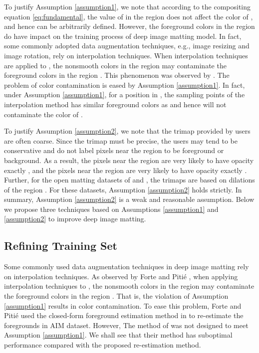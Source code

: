 \documentclass{article}
\theoremstyle{plain}
\begin{document}
To justify Assumption \ref{assumption1}, 
we note that according to the 
compositing equation \eqref{eq:fundamental},
the value of  in the region  does not affect the color of , and hence can be arbitrarily defined.
However, the foreground colors in the region  do have impact on the training process of deep image matting model.
In fact, some commonly adopted data augmentation techniques, e.g., image resizing and image rotation, rely on interpolation techniques.
When interpolation techniques are applied to ,
the nonsmooth colors in the region  may contaminate the foreground colors in the region .
This phenomenon was observed by \cite{Forte2020FBA}.
The problem of color contamination is eased by Assumption \ref{assumption1}.
In fact, under Assumption \ref{assumption1},
for a position  in ,
the sampling points of the interpolation method has similar foreground colors as  and hence will not contaminate the color of .


To justify Assumption \ref{assumption2},
we note that the trimap provided by users are often coarse.
Since the trimap must be precise, the users may tend to be conservative and do not label pixels near the region  to be foreground or background.
As a result, the pixels near the region  are very likely to have opacity exactly , and the pixels near the region  are very likely to have opacity exactly .
Further, 
for the open matting datasets
of \cite{Rhemann2009APerceptually} and \cite{Xu2017DeepImageMatting},
the trimaps are based on dilations of the region
.
For these datasets, Assumption \ref{assumption2} holds strictly.
In summary, Assumption \ref{assumption2} is a weak and  reasonable assumption.
 Below we propose three techniques based on Assumptions \ref{assumption1} and \ref{assumption2} to improve deep image matting.


\subsection{Refining Training Set}
Some commonly used data augmentation techniques in deep image matting rely on interpolation techniques.
As observed by Forte and Piti\'e \cite{Forte2020FBA},
when applying interpolation techniques to ,
the nonsmooth colors in the region  may contaminate the foreground colors in the region .
That is, the violation of Assumption \ref{assumption1} results in color contamination.
To ease this problem,
Forte and  Piti\'e \cite{Forte2020FBA} used the closed-form foreground estimation method in \cite{Levin2008AClosed-Form} to re-estimate the foregrounds in AIM dataset.
However, The method of \cite{Levin2008AClosed-Form} was not designed to meet Assumption \ref{assumption1}.
We shall see that their method has suboptimal performance compared with the proposed re-estimation method.
\end{document}
